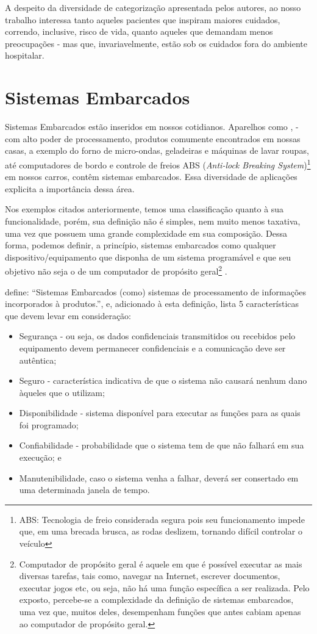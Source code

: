 A despeito da diversidade de categorização apresentada pelos autores, ao nosso
trabalho interessa tanto aqueles pacientes que inspiram maiores cuidados,
correndo, inclusive, risco de vida, quanto aqueles que demandam menos
preocupações - mas que, invariavelmente, estão sob os cuidados fora do
ambiente hospitalar.

\section{Sistemas Embarcados}\label{sec:sistemas-embarcados}

Sistemas Embarcados estão inseridos em nossos cotidianos. Aparelhos como
\smartphones[], \tablets[] - com alto poder de processamento,
produtos comumente encontrados em nossas casas, a exemplo do forno de 
micro-ondas, geladeiras e máquinas de lavar roupas, até computadores de bordo e
controle de freios ABS (\textit{Anti-lock Breaking System})\footnote{ABS:
Tecnologia  de freio considerada segura pois seu funcionamento impede que, em
uma brecada brusca, as rodas  deslizem, tornando difícil controlar o veículo} em
nossos carros, contêm sistemas embarcados. Essa diversidade de aplicações
explicita a importância dessa área.

Nos exemplos citados anteriormente, temos uma classificação quanto à sua
funcionalidade, porém, sua definição não é simples, nem muito menos taxativa,
uma vez que possuem uma grande complexidade em sua composição. Dessa forma,
podemos definir, a princípio, sistemas embarcados como qualquer
dispositivo/equipamento que disponha de um sistema programável e que seu
objetivo não seja o de um computador de propósito geral\footnote{Computador de
propósito geral é aquele em que é possível executar as mais diversas tarefas,
tais como, navegar na Internet, escrever documentos, executar jogos etc, ou
seja, não há uma função específica a ser realizada. Pelo exposto, percebe-se a
complexidade da definição de sistemas embarcados, uma vez que, muitos deles, 
desempenham funções que antes cabiam apenas ao computador de propósito geral.}
\cite{wolf2012computers}.

 define: ``Sistemas Embarcados (como) sistemas
de processamento de informações incorporados à produtos.'', e, adicionado à
esta definição, lista 5 características que devem levar em consideração: 

\begin{itemize}
  \item Segurança - ou seja, os dados confidenciais transmitidos ou recebidos pelo
  equipamento devem permanecer confidenciais e a comunicação deve ser autêntica;
  \item Seguro - característica indicativa de que o sistema não causará nenhum dano àqueles que o utilizam;
  \item Disponibilidade - sistema disponível para executar as funções para as quais
  foi programado; 
  \item Confiabilidade - probabilidade que o sistema tem de que não
  falhará em sua execução; e
  \item Manutenibilidade, caso o sistema venha a falhar, deverá 
  ser consertado em uma determinada janela de tempo.
\end{itemize}

